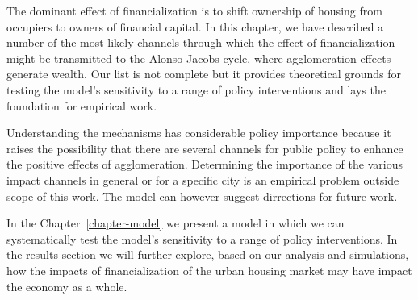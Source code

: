 The dominant effect of financialization is to shift ownership of housing from occupiers to owners of financial capital. In this chapter, we have described a number of the most likely channels through which the effect of financialization might be transmitted to the Alonso-Jacobs cycle, where agglomeration effects generate wealth. Our list is not complete but it provides theoretical grounds for testing the model's sensitivity to a range of policy interventions and lays the foundation for empirical work.  

Understanding the mechanisms has considerable policy importance because it raises the possibility that there are several channels for public policy to enhance the positive effects of agglomeration. Determining the importance of the various impact channels in general or for a specific city is an empirical problem  outside scope of this work. %
The model can however suggest dirrections for future work.

In the Chapter~\ref{chapter-model} we present a model in which we can systematically test the model's sensitivity to a range of policy interventions. %
In the results section we will further explore, based on our analysis and simulations, how the %
impacts of financialization of the urban housing market may have impact %
the economy as a whole. 








